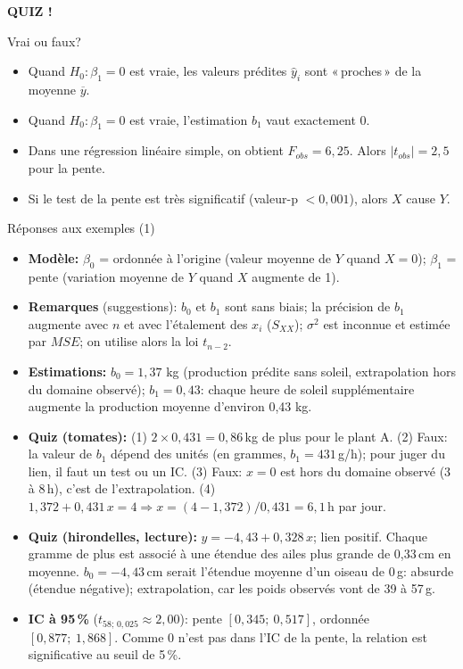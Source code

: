 \documentclass{BeamerTemplate}
\begin{document}
\begin{frame}[plain,t]
  \centerline{\LARGE\bfseries\alert{QUIZ !}}

  \medskip
  Vrai ou faux?
  \begin{itemize}\itemsep 1.2cm
    \item Quand $H_0:\beta_1=0$ est vraie, les valeurs prédites $\hat y_i$ sont
    «\,proches\,» de la moyenne $\overline{y}$.
    \item<2-> Quand $H_0:\beta_1=0$ est vraie, l'estimation $b_1$ vaut exactement 0.
    \item<3-> Dans une régression linéaire simple, on obtient $F_{obs}=6{,}25$.
    Alors $|t_{obs}|=2{,}5$ pour la pente.
    \item<4-> Si le test de la pente est très significatif (valeur-p $<0{,}001$),
    alors $X$ cause $Y$.
  \end{itemize}
\end{frame}

\begin{frame}[t]{Réponses aux exemples (1)}

\scriptsize
\begin{itemize}\itemsep1mm
  \item \textbf{Modèle:} $\beta_0$ = ordonnée à l'origine (valeur moyenne de $Y$
  quand $X=0$); $\beta_1$ = pente (variation moyenne de $Y$ quand $X$ augmente de 1).
  \item \textbf{Remarques} (suggestions): $b_0$ et $b_1$ sont sans biais; la précision
  de $b_1$ augmente avec $n$ et avec l'étalement des $x_i$ ($S_{XX}$); $\sigma^2$ est
  inconnue et estimée par $MSE$; on utilise alors la loi $t_{n-2}$.
  \item \textbf{Estimations:} $b_0=1{,}37$ kg (production prédite sans soleil,
  extrapolation hors du domaine observé); $b_1=0{,}43$: chaque heure de soleil
  supplémentaire augmente la production moyenne d'environ 0,43 kg.
  \item \textbf{Quiz (tomates):} (1) $2\times0{,}431=0{,}86$\,kg de plus pour le plant A.
  (2) Faux: la valeur de $b_1$ dépend des unités (en grammes, $b_1=431$\,g/h); pour
  juger du lien, il faut un test ou un IC. (3) Faux: $x=0$ est hors du domaine
  observé (3 à 8\,h), c'est de l'extrapolation. (4) $1{,}372+0{,}431\,x=4
  \Rightarrow x=(4-1{,}372)/0{,}431=6{,}1$\,h par jour.
  \item \textbf{Quiz (hirondelles, lecture):} $\hat y=-4{,}43+0{,}328\,x$; lien
  positif. Chaque gramme de plus est associé à une étendue des ailes plus grande de
  0,33\,cm en moyenne. $b_0=-4{,}43$\,cm serait l'étendue moyenne d'un oiseau de
  0\,g: absurde (étendue négative); extrapolation, car les poids observés vont de
  39 à 57\,g.
  \item \textbf{IC à 95\,\%} ($t_{58;\,0{,}025}\approx2{,}00$): pente $[0{,}345;\ 0{,}517]$,
  ordonnée $[0{,}877;\ 1{,}868]$. Comme 0 n'est pas dans l'IC de la pente, la relation
  est significative au seuil de 5\,\%.
\end{itemize}

\end{frame}
\end{document}

